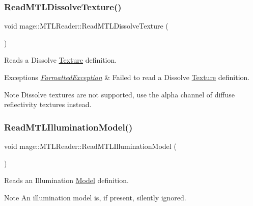 \subsubsection{\texorpdfstring{Read\+M\+T\+L\+Dissolve\+Texture()}{ReadMTLDissolveTexture()}}
{\footnotesize\ttfamily void mage\+::\+M\+T\+L\+Reader\+::\+Read\+M\+T\+L\+Dissolve\+Texture (\begin{DoxyParamCaption}{ }\end{DoxyParamCaption})\hspace{0.3cm}{\ttfamily [private]}}

Reads a Dissolve \hyperlink{classmage_1_1_texture}{Texture} definition.


\begin{DoxyExceptions}{Exceptions}
{\em \hyperlink{structmage_1_1_formatted_exception}{Formatted\+Exception}} & Failed to read a Dissolve \hyperlink{classmage_1_1_texture}{Texture} definition. \\
\hline
\end{DoxyExceptions}
\begin{DoxyNote}{Note}
Dissolve textures are not supported, use the alpha channel of diffuse reflectivity textures instead. 
\end{DoxyNote}
\hypertarget{classmage_1_1_m_t_l_reader_a77bbb659fe66e9bad451281dbd0c49d7}{}\label{classmage_1_1_m_t_l_reader_a77bbb659fe66e9bad451281dbd0c49d7} 
\subsubsection{\texorpdfstring{Read\+M\+T\+L\+Illumination\+Model()}{ReadMTLIlluminationModel()}}
{\footnotesize\ttfamily void mage\+::\+M\+T\+L\+Reader\+::\+Read\+M\+T\+L\+Illumination\+Model (\begin{DoxyParamCaption}{ }\end{DoxyParamCaption})\hspace{0.3cm}{\ttfamily [private]}}

Reads an Illumination \hyperlink{classmage_1_1_model}{Model} definition.

\begin{DoxyNote}{Note}
An illumination model is, if present, silently ignored. 
\end{DoxyNote}

